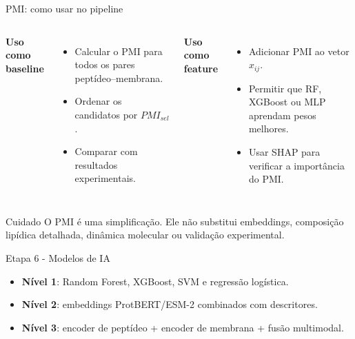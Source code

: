 \documentclass[aspectratio=169,10pt]{beamer}
\begin{document}
\begin{frame}{PMI: como usar no pipeline}
\small
\begin{columns}[T]
\textbf{Uso como baseline}
\begin{itemize}
  \item Calcular o PMI para todos os pares peptídeo--membrana.
  \item Ordenar os candidatos por $PMI_{sel}$.
  \item Comparar com resultados experimentais.
\end{itemize}

\textbf{Uso como feature}
\begin{itemize}
  \item Adicionar PMI ao vetor $x_{ij}$.
  \item Permitir que RF, XGBoost ou MLP aprendam pesos melhores.
  \item Usar SHAP para verificar a importância do PMI.
\end{itemize}
\end{columns}

\vspace{0.25cm}
\begin{block}{Cuidado}
O PMI é uma simplificação. Ele não substitui embeddings, composição lipídica detalhada, dinâmica molecular ou validação experimental.
\end{block}
\end{frame}

\begin{frame}{Etapa 6 - Modelos de IA}
\begin{center}
\end{center}

\vspace{0.3cm}
\begin{itemize}
  \item \textbf{Nível 1}: Random Forest, XGBoost, SVM e regressão logística.
  \item \textbf{Nível 2}: embeddings ProtBERT/ESM-2 combinados com descritores.
  \item \textbf{Nível 3}: encoder de peptídeo + encoder de membrana + fusão multimodal.
\end{itemize}
\end{frame}
\end{document}

